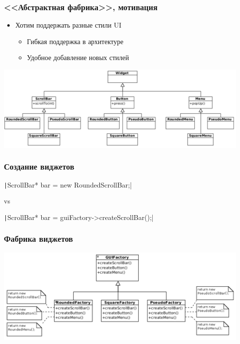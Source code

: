 \documentclass{../../slides-style}
\begin{document}
    \begin{frame}
        \frametitle{<<Абстрактная фабрика>>, мотивация}
        \begin{itemize}
            \item Хотим поддержать разные стили UI
            \begin{itemize}
                \item Гибкая поддержка в архитектуре
                \item Удобное добавление новых стилей
            \end{itemize}
        \end{itemize}
        \begin{center}
            \includegraphics[width=0.95\textwidth]{widgets.png}
        \end{center}
    \end{frame}

    \begin{frame}
        \frametitle{Создание виджетов}
        \texttt|ScrollBar* bar = new RoundedScrollBar;|
        
        \vspace{2mm}
        
        vs
        
        \vspace{2mm}
        
        \texttt|ScrollBar* bar = guiFactory->createScrollBar();|
    \end{frame}

    \begin{frame}
        \frametitle{Фабрика виджетов}
        \begin{center}
            \includegraphics[width=0.95\textwidth]{widgetFactory.png}
        \end{center}
    \end{frame}
\end{document}
